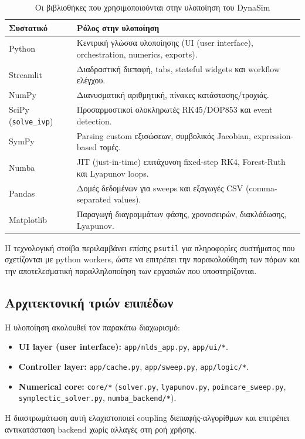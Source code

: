 \documentclass[11pt,a4paper]{report}
\begin{document}
\begin{table}[H]
\centering
\caption{Οι βιβλιοθήκες που χρησιμοποιούνται στην υλοποίηση του DynaSim}
\label{tab:ch2-stack}
\renewcommand{\arraystretch}{1.15}
\begin{tabular}{|l|p{}|}
\hline
\textbf{Συστατικό} & \textbf{Ρόλος στην υλοποίηση} \\
\hline
Python & Κεντρική γλώσσα υλοποίησης (UI (user interface), orchestration, numerics, exports). \\
\hline
Streamlit & Διαδραστική διεπαφή, tabs, stateful widgets και workflow ελέγχου. \\
\hline
NumPy & Διανυσματική αριθμητική, πίνακες κατάστασης/τροχιάς. \\
\hline
SciPy (\texttt{solve\_ivp}) & Προσαρμοστικοί ολοκληρωτές RK45/DOP853 και event detection. \\
\hline
SymPy & Parsing custom εξισώσεων, συμβολικός Jacobian, expression-based τομές. \\
\hline
Numba & JIT (just-in-time) επιτάχυνση fixed-step RK4, Forest-Ruth και Lyapunov loops. \\
\hline
Pandas & Δομές δεδομένων για sweeps και εξαγωγές CSV (comma-separated values). \\
\hline
Matplotlib & Παραγωγή διαγραμμάτων φάσης, χρονοσειρών, διακλάδωσης, Lyapunov. \\
\hline
\end{tabular}
\end{table}

Η τεχνολογική στοίβα περιλαμβάνει επίσης
\texttt{psutil} για πληροφορίες συστήματος που σχετίζονται με python workers, ώστε να επιτρέπει την παρακολούθηση των πόρων 
και την αποτελεσματική παραλληλοποίηση των εργασιών που υποστηρίζονται.

\subsection{Αρχιτεκτονική τριών επιπέδων}
\label{subsec:three-layer-architecture}

\begin{importantbox}
Η υλοποίηση ακολουθεί τον παρακάτω διαχωρισμό:
\begin{itemize}
\item \textbf{UI layer (user interface):} \texttt{app/nlds\_app.py}, \texttt{app/ui/*}.
\item \textbf{Controller layer:} \texttt{app/cache.py}, \texttt{app/sweep.py},
\texttt{app/logic/*}.
\item \textbf{Numerical core:} \texttt{core/*}
(\texttt{solver.py}, \texttt{lyapunov.py},
\texttt{poincare\_sweep.py}, \texttt{symplectic\_solver.py},
\texttt{numba\_backend/*}).
\end{itemize}

Η διαστρωμάτωση αυτή ελαχιστοποιεί coupling διεπαφής-αλγορίθμων και επιτρέπει
αντικατάσταση backend χωρίς αλλαγές στη ροή χρήσης.
\end{importantbox}
\end{document}
